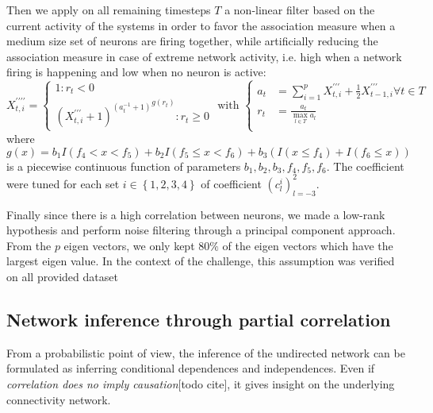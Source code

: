 \documentclass[wcp]{jmlr}
\begin{document}
Then we apply on all remaining timesteps $T$ a non-linear filter based on the current
activity of the systems in order to favor the association measure when
a medium size set of neurons are firing together, while artificially
reducing the association measure in case of extreme network activity,
i.e. high when a network firing is happening and low when no neuron is
active:
\begin{equation}
X^{\prime\prime\prime\prime}_{t,i} =
\left\{
  \begin{array}{l}
    1  : r_t < 0\\
    {(X^{\prime\prime\prime}_{t,i} + 1)^{(a_t^{-1} + 1)}}^{g(r_t)} : r_t \geq 0
  \end{array}
\right.
\text{ with }
\left\{
  \begin{array}{ll}
    a_t &= \sum_{i=1}^p X^{\prime\prime\prime}_{t,i} +
                       \frac{1}{2} X^{\prime\prime\prime}_{t-1,i} \forall t \in T\\
    r_t &= \frac{a_t}{\max_{l \in T}{a_l}} \\
  \end{array}
\right.
\end{equation}
where $g(x) = b_1 I(f_4 < x < f_5) + b_2  I(f_5 \leq x < f_6) +
b_3 (I(x\leq f_4) + I(f_ 6 \leq x))$ is a piecewise continuous function of
parameters $b_1, b_2, b_3, f_4, f_5, f_6$. The coefficient were tuned
for each set $i\in\left\{1, 2, 3, 4\right\}$ of coefficient
$\left(c_l^i\right)_{l=-3}^2$.

Finally since there is a high correlation between neurons, we made a
low-rank hypothesis and perform noise filtering through a principal component
approach. From the $p$ eigen vectors, we only kept $80\%$ of
the eigen vectors which have the largest eigen value. In the context of the
challenge, this assumption was verified on all provided dataset

\subsection{Network inference through partial correlation}
\label{sec:inference}

From a probabilistic point of view, the inference of the undirected network
can be formulated as inferring conditional dependences and independences. Even
if \textit{correlation does no imply causation}[todo cite], it gives insight
on the underlying connectivity network.
\end{document}
